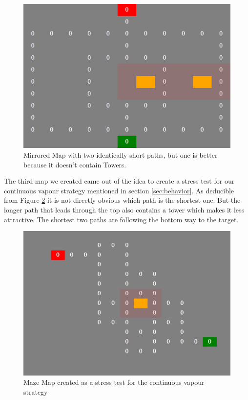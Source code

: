 \begin{figure}[H]
  \centering
  \includegraphics[width=1\linewidth]{images/map_mirror}
  \caption{Mirrored Map with two identically short paths, but one is better because it doesn't contain Towers.}
  \label{fig:mapsmirror}
\end{figure}


The third map we created came out of the idea to create a stress test for our continuous vapour strategy mentioned in section \ref{sec:behavior}. As deducible from Figure \ref{fig:mapsmaze} it is not directly obvious which path is the shortest one. But the longer path that leads through the top also contains a tower which makes it less attractive. The shortest two paths are following the bottom way to the target.

\begin{figure}[H]
  \centering
  \includegraphics[width=1\linewidth]{images/map_maze}
  \caption{Maze Map created as a stress test for the continuous vapour strategy}
  \label{fig:mapsmaze}
\end{figure}
